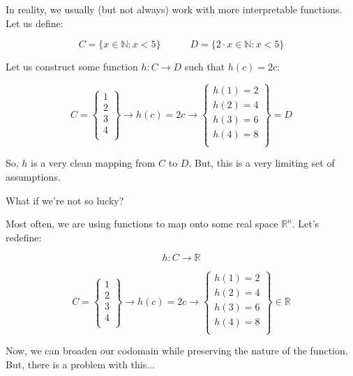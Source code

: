 \documentclass[10pt]{beamer}
\begin{document}
\begin{frame}

In reality, we usually (but not always) work with more interpretable functions. Let us define:

\[C = \{x\in \mathbb{N}: x < 5\} \quad \quad \quad D = \{2 \cdot x \in \mathbb{N}:x < 5\}\]

Let us construct some function $h: C \rightarrow D$ such that $h(c) = 2c$:

\[C = \begin{Bmatrix}
    1 \\
    2 \\
    3 \\
    4 \\
   
\end{Bmatrix} \rightarrow h(c) = 2 c \rightarrow 
\begin{Bmatrix}
    h(1) = 2 \\
    h(2) = 4 \\
    h(3) = 6 \\
    h(4) = 8 \\
    
\end{Bmatrix} = D\]

So, $h$ is a very clean mapping from $C$ to $D$. But, this is a very limiting set of assumptions.

    
\end{frame}

\begin{frame}{What if we're not so lucky?}

Most often, we are using functions to map onto some real space $\mathbb{R}^n$. Let's redefine:

\[h: C \rightarrow \mathbb{R}\]

\[C = \begin{Bmatrix}
    1 \\
    2 \\
    3 \\
    4 \\
   
\end{Bmatrix} \rightarrow h(c) = 2 c \rightarrow 
\begin{Bmatrix}
    h(1) = 2 \\
    h(2) = 4 \\
    h(3) = 6 \\
    h(4) = 8 \\
    
\end{Bmatrix} \in \mathbb{R}\]

Now, we can broaden our codomain while preserving the nature of the function. But, there is a problem with this...

\end{frame}
\end{document}
